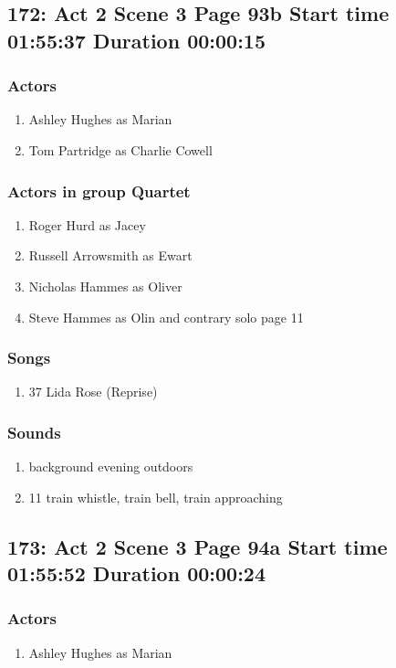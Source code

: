 \subsection{172: Act 2 Scene 3 Page 93b Start time 01:55:37 Duration 00:00:15}

\subsubsection{Actors}
\begin{enumerate}
\item Ashley Hughes as Marian
\item Tom Partridge as Charlie Cowell
\end{enumerate}
\subsubsection{Actors in group Quartet}
\begin{enumerate}
\item Roger Hurd as Jacey
\item Russell Arrowsmith as Ewart
\item Nicholas Hammes as Oliver
\item Steve Hammes as Olin and contrary solo page 11
\end{enumerate}

\subsubsection{Songs}
\begin{enumerate}
\item 37 Lida Rose (Reprise)
\end{enumerate}\subsubsection{Sounds}
\begin{enumerate}
\item background evening outdoors
\item 11 train whistle, train bell, train approaching
\end{enumerate}
\subsection{173: Act 2 Scene 3 Page 94a Start time 01:55:52 Duration 00:00:24}

\subsubsection{Actors}
\begin{enumerate}
\item Ashley Hughes as Marian
\end{enumerate}
